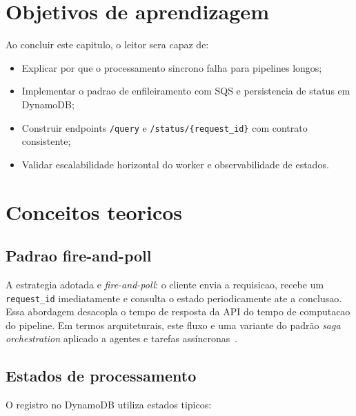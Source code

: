 \section{Objetivos de aprendizagem}

Ao concluir este capitulo, o leitor sera capaz de:

\begin{itemize}[leftmargin=*]
  \item Explicar por que o processamento sincrono falha para pipelines longos;
  \item Implementar o padrao de enfileiramento com
        SQS e persistencia de status em
        DynamoDB;
  \item Construir endpoints \texttt{/query} e \texttt{/status/\{request\_id\}} com
        contrato consistente;
  \item Validar escalabilidade horizontal do worker e observabilidade de estados.
\end{itemize}

\section{Conceitos teoricos}

\subsection{Padrao fire-and-poll}

A estrategia adotada e \textit{fire-and-poll}:
o cliente envia a requisicao, recebe um \texttt{request\_id} imediatamente e
consulta o estado periodicamente ate a conclusao. Essa abordagem desacopla o
tempo de resposta da API do tempo de computacao do pipeline. Em termos
arquiteturais, este fluxo e uma variante do padr\~ao \textit{saga orchestration}
aplicado a agentes e tarefas ass\'incronas~\cite{awsagentic2025}.

\subsection{Estados de processamento}

O registro no DynamoDB utiliza estados tipicos:

